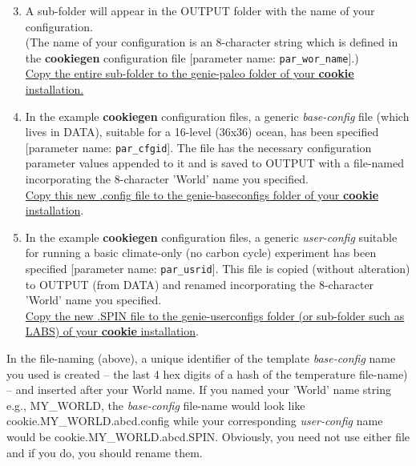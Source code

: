 \begin{enumerate}
\setcounter{enumi}{2}

\vspace{2mm}
\item A sub-folder will appear in the \textsf{\footnotesize OUTPUT} folder with the name of your configuration.
\\(The name of your configuration is an 8-character string which is defined in the \textbf{cookiegen} configuration file [parameter name: \texttt{\small par\_wor\_name}].)
\\\uline{Copy the entire sub-folder to the \textsf{\footnotesize genie-paleo} folder of your \textbf{cookie} installation.}

\vspace{2mm}
\item In the example \textbf{cookiegen} configuration files, a generic \textit{base-config} file (which lives in \textsf{\footnotesize DATA}), suitable for a 16-level (36x36) ocean, has been specified [parameter name: \texttt{\small  par\_cfgid}]. The file has the necessary configuration parameter values appended to it and is saved to \textsf{\footnotesize OUTPUT} with a file-named incorporating the 8-character 'World' name you specified.
\\\uline{Copy this new \textsf{\footnotesize .config} file to the \textsf{\footnotesize genie-baseconfigs} folder of your \textbf{cookie} installation}.

\vspace{2mm}
\item In the example \textbf{cookiegen} configuration files, a generic \textit{user-config} suitable for running a basic climate-only (no carbon cycle) experiment has been specified [parameter name: \texttt{\small  par\_usrid}]. This file is copied (without alteration) to \textsf{\footnotesize OUTPUT} (from \textsf{\footnotesize DATA}) and renamed incorporating the 8-character 'World' name you specified.
\\\uline{Copy the new  \textsf{\footnotesize .SPIN} file to the \textsf{\footnotesize genie-userconfigs} folder (or sub-folder such as \textsf{\footnotesize LABS}) of your \textbf{cookie} installation}.

\end{enumerate}

\vspace{2mm}
\noindent In the file-naming (above), a unique identifier of the template \textit{base-config} name you used is created -- the last 4 hex digits of a hash of the temperature file-name) -- and inserted after your World name. If you named your 'World' name string e.g., \textsf{\footnotesize MY\_WORLD}, the \textit{base-config} file-name would look like \textsf{\footnotesize cookie.MY\_WORLD.abcd.config} while your corresponding \textit{user-config} name would be \textsf{\footnotesize cookie.MY\_WORLD.abcd.SPIN}. Obviously, you need not use either file and if you do, you should rename them.

